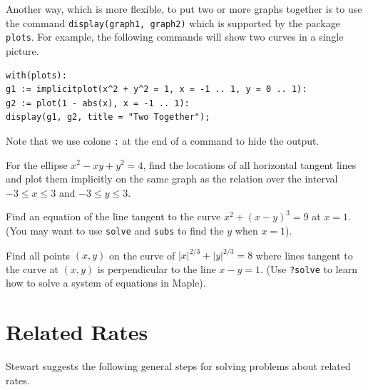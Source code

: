 \documentclass[]{book}
\theoremstyle{definition}
\theoremstyle{definition}
\theoremstyle{definition}
\theoremstyle{remark}
\let\BeginKnitrBlock\begin \let\EndKnitrBlock\end
\begin{document}
\BeginKnitrBlock{remark}
{}
Another way, which is more flexible, to put two or more graphs together is to use the command \texttt{display(graph1,\ graph2)} which is supported by the package \texttt{plots}. For example, the following commands will show two curves in a single picture.

\begin{verbatim}
with(plots):
g1 := implicitplot(x^2 + y^2 = 1, x = -1 .. 1, y = 0 .. 1):
g2 := plot(1 - abs(x), x = -1 .. 1):
display(g1, g2, title = "Two Together");
\end{verbatim}

Note that we use colone \texttt{:} at the end of a command to hide the output.
\EndKnitrBlock{remark}

\BeginKnitrBlock{exercise}
\protect\hypertarget{exr:unnamed-chunk-25}{}{\label{exr:unnamed-chunk-25} }
For the ellipse \(x^2-xy+y^2=4\), find the locations of all horizontal tangent lines and plot them implicitly on the same graph as the relation over the interval \(-3 \leq x \leq 3\) and \(-3 \leq y \leq 3\).
\EndKnitrBlock{exercise}

\BeginKnitrBlock{exercise}
\protect\hypertarget{exr:unnamed-chunk-26}{}{\label{exr:unnamed-chunk-26} }
Find an equation of the line tangent to the curve \(x^2 + (x-y)^3 = 9\) at \(x=1\). (You may want to use \texttt{solve} and \texttt{subs} to find the \(y\) when \(x=1\)).
\EndKnitrBlock{exercise}

\BeginKnitrBlock{exercise}
\protect\hypertarget{exr:unnamed-chunk-27}{}{\label{exr:unnamed-chunk-27} }
Find all points \((x, y)\) on the curve of \(|x|^{2/3} + |y|^{2/3} = 8\) where lines tangent to the curve at \((x, y)\) is perpendicular to the line \(x-y=1\). (Use \texttt{?solve} to learn how to solve a system of equations in Maple).
\EndKnitrBlock{exercise}

\hypertarget{related-rates}{%
\section{Related Rates}\label{related-rates}}

Stewart suggests the following general steps for solving problems about related rates.
\end{document}
